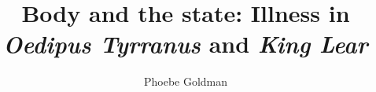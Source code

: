 \title{Body and the state: Illness in \textit{Oedipus Tyrranus} and \textit{King Lear}}
\author{Phoebe Goldman}
\date{}

\newcommand{\theprof}{Profs. Olga Taxidou and Liana Theodoratou}
\newcommand{\theclass}{Theater and Medicine}
